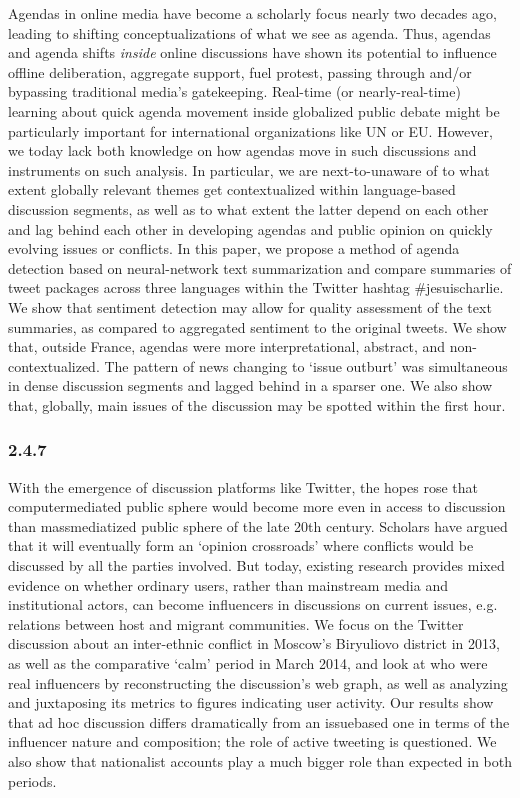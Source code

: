 Agendas in online media have become a scholarly focus nearly two decades ago, leading to shifting conceptualizations of what we see as agenda. Thus, agendas and agenda shifts \textit{inside} online discussions have shown its potential to influence offline deliberation, aggregate support, fuel protest, passing through and/or bypassing traditional media’s gatekeeping. Real-time (or nearly-real-time) learning about quick agenda movement inside globalized public debate might be particularly important for international organizations like UN or EU. However, we today lack both knowledge on how agendas move in such discussions and instruments on such analysis. In particular, we are next-to-unaware of to what extent globally relevant themes get contextualized within language-based discussion segments, as well as to what extent the latter depend on each other and lag behind each other in developing agendas and public opinion on quickly evolving issues or conflicts. In this paper, we propose a method of agenda detection based on neural-network text summarization and compare summaries of tweet packages across three languages within the Twitter hashtag \#jesuischarlie. We show that sentiment detection may allow for quality assessment of the text summaries, as compared to aggregated sentiment to the original tweets. We show that, outside France, agendas were more interpretational, abstract, and non-contextualized. The pattern of news changing to ‘issue outburt’ was simultaneous in dense discussion segments and lagged behind in a sparser one. We also show that, globally, main issues of the discussion may be spotted within the first hour.

\subsubsection{2.4.7}

With the emergence of discussion platforms like Twitter, the hopes rose that computermediated public sphere would become more even in access to discussion than massmediatized public sphere of the late 20th century. Scholars have argued that it will eventually form an ‘opinion crossroads’ where conflicts would be discussed by all the parties involved. But today, existing research provides mixed evidence on whether ordinary users, rather than mainstream media and institutional actors, can become influencers in discussions on current issues, e.g. relations between host and migrant communities. We focus on the Twitter discussion about an inter-ethnic conflict in Moscow’s Biryuliovo district in 2013, as well as the comparative ‘calm’ period in March 2014, and look at who were real influencers by reconstructing the discussion’s web graph, as well as analyzing and juxtaposing its metrics to figures indicating user activity. Our results show that ad hoc discussion differs dramatically from an issuebased one in terms of the influencer nature and composition; the role of active tweeting is questioned. We also show that nationalist accounts play a much bigger role than expected in both periods.

